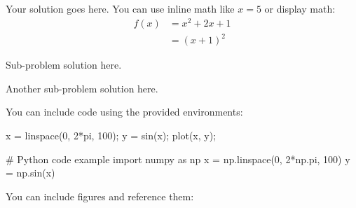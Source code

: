 \documentclass{homework}
\begin{document}


Your solution goes here. You can use inline math like $x = 5$ or display math:
\begin{align}
    f(x) &= x^2 + 2x + 1 \\
    &= (x + 1)^2
\end{align}

\subproblem
Sub-problem solution here.

\subproblem
Another sub-problem solution here.


You can include code using the provided environments:

\begin{hwmatlab}
x = linspace(0, 2*pi, 100);
y = sin(x);
plot(x, y);
\end{hwmatlab}

\begin{hwpython}
# Python code example
import numpy as np
x = np.linspace(0, 2*np.pi, 100)
y = np.sin(x)
\end{hwpython}



You can include figures and reference them:

% 
\end{document}
